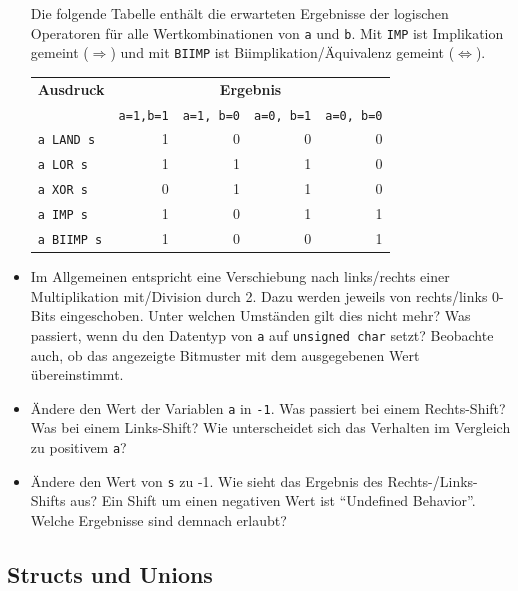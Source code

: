 \begin{itemize}
Die folgende Tabelle enthält die erwarteten Ergebnisse der logischen Operatoren für alle Wertkombinationen von \lstinline|a| und \lstinline|b|.
Mit \texttt{IMP} ist Implikation gemeint ($\Rightarrow$) und mit \texttt{BIIMP} ist Biimplikation/Äquivalenz gemeint ($\Leftrightarrow$).\\[1ex]
\begin{center}
\begin{tabular}{lrrrr}
    \toprule
    \textbf{Ausdruck} & \multicolumn{4}{c}{\textbf{Ergebnis}}\\
    & \lstinline|a=1,b=1| & \lstinline|a=1, b=0| & \lstinline|a=0, b=1| & \lstinline|a=0, b=0|\\
    \midrule
    \texttt{a LAND s}  & 1  & 0& 0& 0\\
    \texttt{a LOR s}   & 1  & 1& 1& 0\\
    \texttt{a XOR s}   & 0  & 1& 1& 0\\
    \texttt{a IMP s}   & 1  & 0& 1& 1\\
    \texttt{a BIIMP s} & 1  & 0& 0& 1\\
    \bottomrule
\end{tabular}
\end{center}
\item 
Im Allgemeinen entspricht eine Verschiebung nach links/rechts einer Multiplikation mit/Division durch 2.
Dazu werden jeweils von rechts/links 0-Bits eingeschoben.
Unter welchen Umständen gilt dies nicht mehr?
Was passiert, wenn du den Datentyp von \lstinline|a| auf \lstinline|unsigned char| setzt?
Beobachte auch, ob das angezeigte Bitmuster mit dem ausgegebenen Wert übereinstimmt.
\item 
Ändere den Wert der Variablen \lstinline|a| in \lstinline|-1|.
Was passiert bei einem Rechts-Shift?
Was bei einem Links-Shift?
Wie unterscheidet sich das Verhalten im Vergleich zu positivem \lstinline|a|?
\item 
Ändere den Wert von \lstinline|s| zu -1.
Wie sieht das Ergebnis des Rechts-/Links-Shifts aus?
Ein Shift um einen negativen Wert ist \enquote{Undefined Behavior}.
Welche Ergebnisse sind demnach erlaubt?
\end{itemize}

\subsection{Structs und Unions \optional}

